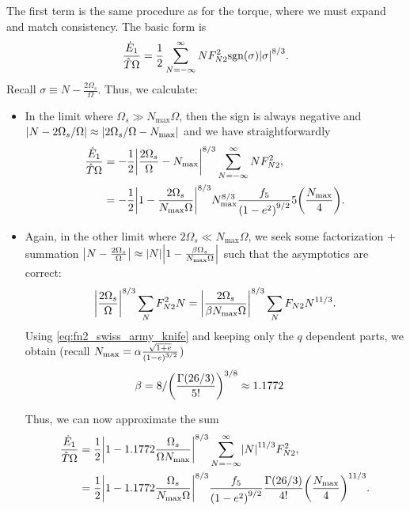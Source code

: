 \documentclass[11pt,
        usenames, %
        dvipsnames %
    ]{article}
\DeclarePairedDelimiter\abs{\lvert}{\rvert}
\DeclarePairedDelimiter\p{\lparen}{\rparen}
\begin{document}
The first term is the same procedure as for the torque, where we must expand and
match consistency. The basic form is
\begin{equation}
    \frac{\dot{E}_1}{\hat{T}\Omega} = \frac{1}{2}
        \sum\limits_{N = -\infty}^\infty NF_{N2}^2 \mathrm{sgn}(\sigma)
            \abs*{\sigma}^{8/3}.
\end{equation}
Recall $\sigma \equiv N - \frac{2\Omega_s}{\Omega}$. Thus, we calculate:
\begin{itemize}
    \item In the limit where $\Omega_s \gg N_{\max}\Omega$, then the sign is
        always negative and $\abs*{N - 2\Omega_s / \Omega} \approx
        \abs*{2\Omega_s / \Omega - N_{\max}}$ and we have straightforwardly
        \begin{align}
            \frac{\dot{E}_1}{\hat{T}\Omega}
                &= -\frac{1}{2}
                    \abs*{\frac{2\Omega_s}{\Omega} - N_{\max}}^{8/3}
                    \sum\limits_{N = -\infty}^\infty NF_{N2}^2,\\
                &= -\frac{1}{2}
                    \abs*{1 - \frac{2\Omega_s}{N_{\max}\Omega}}^{8/3}
                    N_{\max}^{8/3}
                    \frac{f_5}{\p*{1 - e^2}^{9/2}}5\p*{\frac{N_{\max}}{4}}.
        \end{align}
    \item Again, in the other limit where $2\Omega_s \ll N_{\max}\Omega$, we
        seek some factorization + summation $\abs*{N - \frac{2\Omega_s}{\Omega}}
        \approx \abs*{N}\abs*{1 - \frac{\beta \Omega_s}{N_{\max}\Omega}}$ such
        that the asymptotics are correct:
        \begin{equation}
            \abs*{\frac{2\Omega_s}{\Omega}}^{8/3} \sum\limits_N F_{N2}^2 N
                = \abs*{\frac{2\Omega_s}{\beta N_{\max}\Omega}}^{8/3}
                    \sum\limits_N F_{N2}N^{11/3}.
        \end{equation}
        Using \autoref{eq:fn2_swiss_army_knife} and keeping only the $q$
        dependent parts, we obtain (recall $N_{\max} = \alpha \frac{\sqrt{1 +
        e}}{\p*{1 - e}^{3/2}}$)
        \begin{align}
            \beta &= 8 / \p*{\frac{\Gamma(26/3)}{5!}}^{3/8} \approx 1.1772
        \end{align}

        Thus, we can now approximate the sum
        \begin{align}
            \frac{\dot{E}_1}{\hat{T}\Omega}
                &= \frac{1}{2}
                    \abs*{1 - 1.1772\frac{\Omega_s}{\Omega N_{\max}}}^{8/3}
                    \sum\limits_{N = -\infty}^\infty \abs*{N}^{11/3}F_{N2}^2,\\
                &= \frac{1}{2}
                    \abs*{1 - 1.1772\frac{\Omega_s}{N_{\max}\Omega}}^{8/3}
                    \frac{f_5}{\p*{1 - e^2}^{9/2}}
                    \frac{\Gamma(26/3)}{4!}\p*{\frac{N_{\max}}{4}}^{11/3}.
        \end{align}
\end{itemize}
\end{document}
